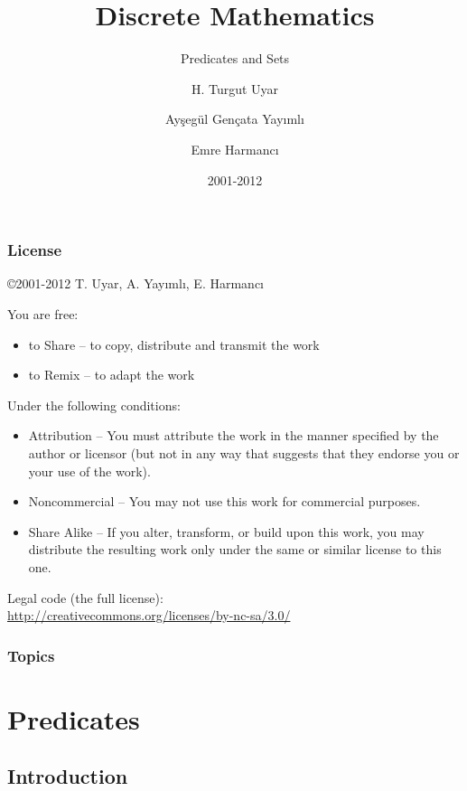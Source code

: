 \documentclass[dvipsnames]{beamer}
\title{Discrete Mathematics}
\subtitle{Predicates and Sets}
\author{H. Turgut Uyar \and Ayşegül Gençata Yayımlı \and Emre Harmancı}
\date{2001-2012}
\begin{document}
\begin{frame}
  \titlepage
\end{frame}

\begin{frame}
  \frametitle{License}

  \hfill
  \copyright 2001-2012 T. Uyar, A. Yayımlı, E. Harmancı

  \vfill
  \begin{tiny}
    You are free:
    \begin{itemize}
      \item to Share -- to copy, distribute and transmit the work
      \item to Remix -- to adapt the work
    \end{itemize}

    Under the following conditions:
    \begin{itemize}
      \item Attribution -- You must attribute the work in the manner specified by
        the author or licensor (but not in any way that suggests that they
        endorse you or your use of the work).

      \item Noncommercial -- You may not use this work for commercial purposes.

      \item Share Alike -- If you alter, transform, or build upon this work, you
        may distribute the resulting work only under the same or similar license
        to this one.
    \end{itemize}
  \end{tiny}

  \vfill
  Legal code (the full license):\\
  \url{http://creativecommons.org/licenses/by-nc-sa/3.0/}
\end{frame}

\begin{frame}
  \frametitle{Topics}
  \tableofcontents
\end{frame}

\section{Predicates}

\subsection{Introduction}
\end{document}
